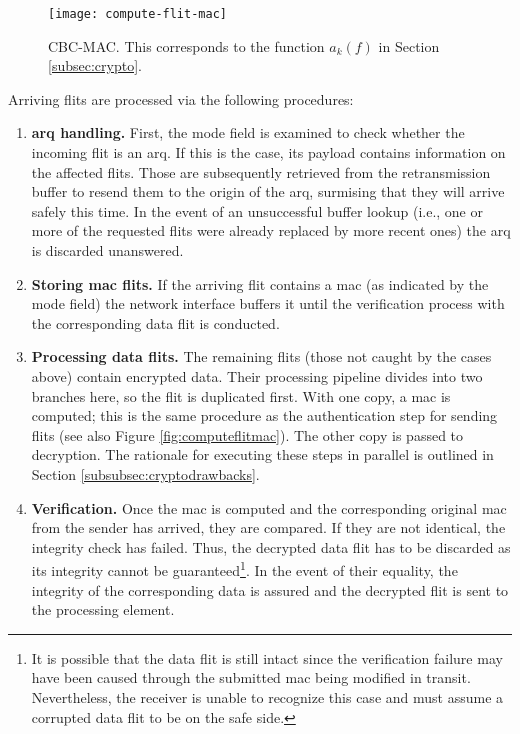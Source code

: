 \begin{figure}
    \centering
    \texttt{[image: compute-flit-mac]}
    \caption[short]{CBC-MAC. This corresponds to the function $a_k(f)$ in Section \ref{subsec:crypto}.}%
    \label{fig:computeflitmac}
\end{figure}

Arriving flits are processed via the following procedures:
\begin{enumerate}
    \item \textbf{\Gls{arq} handling.} First, the mode field is examined to check whether the incoming flit is an \gls{arq}. If this is the case, its
        payload contains information on the affected flits. Those are subsequently retrieved from the retransmission buffer to resend them to the
        origin of the \gls{arq}, surmising that they will arrive safely this time. In the event of an unsuccessful buffer lookup (i.e., one or more of
        the requested flits were already replaced by more recent ones) the \gls{arq} is discarded unanswered.
    \item \textbf{Storing \gls{mac} flits.} If the arriving flit contains a \gls{mac} (as indicated by the mode field) the network interface buffers
        it until the verification process with the corresponding data flit is conducted.
    \item \textbf{Processing data flits.} The remaining flits (those not caught by the cases above) contain encrypted data. Their processing pipeline
        divides into two branches here, so the flit is duplicated first. With one copy, a \gls{mac} is computed; this is the same procedure as the
        authentication step for sending flits (see also Figure \vref{fig:computeflitmac}). The other copy is passed to decryption. The rationale for
        executing these steps in parallel is outlined in Section \ref{subsubsec:cryptodrawbacks}.
    \item \textbf{Verification.} Once the \gls{mac} is computed and the corresponding original \gls{mac} from the sender has arrived, they are
        compared. If they are not identical, the integrity check has failed. Thus, the decrypted data flit has to be discarded as its integrity
        cannot be guaranteed\footnote{It is possible that the data flit is still intact since the verification failure may have been caused through
        the submitted \gls{mac} being modified in transit. Nevertheless, the receiver is unable to recognize this case and must assume a corrupted
        data flit to be on the safe side.}. In the event of their equality, the integrity of the corresponding data is assured and the decrypted flit
        is sent to the processing element.
\end{enumerate}
\vspace{0.5\baselineskip}

